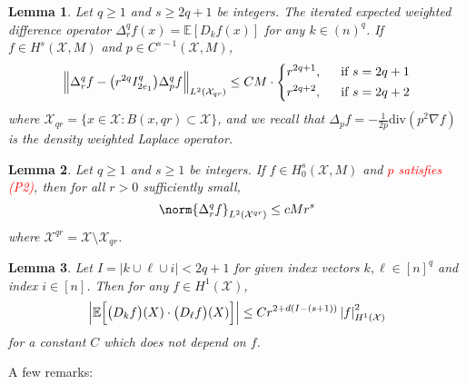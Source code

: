 \documentclass{article}
\newcommand{\abs}[1]{\left \lvert #1 \right \rvert}
\newcommand{\1}{\mathbf{1}}
\newcommand{\Xset}{\mathcal{X}}
\newcommand{\Leb}{L}
\newcommand{\Ebb}{\mathbb{E}}
\theoremstyle{alden}
\theoremstyle{aldenthm}
\newtheorem{lemma}{Lemma}
\theoremstyle{definition}
\theoremstyle{remark}
\begin{document}
\begin{lemma}
	\label{lem:expected_difference_sobolev}
	Let $q \geq 1$ and $s \geq 2q + 1$ be integers. The iterated expected weighted difference operator  $\Delta_r^qf(x) = \Ebb[D_kf(x)]$ for any $k \in (n)^q$. If $f \in H^s(\Xset,M)$ and $p \in C^{s-1}(\Xset,M)$,
	\begin{equation*}
	\Bigl\|\Delta_r^qf - \bigl(r^{2q} I_{2e_1}^{q}\bigr) \Delta_{p}^qf\Bigr\|_{\Leb^2(\Xset_{qr})} \leq CM \cdot
	\begin{dcases}
	r^{2q + 1},& ~~\textrm{if $s = 2q + 1$} \\
	r^{2q + 2},& ~~\textrm{if $s = 2q + 2$}
	\end{dcases}
	\end{equation*}
	where $\Xset_{qr} = \{x \in \Xset: B(x,qr) \subset \Xset\}$, and we recall that $\Delta_pf = -\frac{1}{2p}\mathrm{div}(p^2 \nabla f)$ is the density weighted Laplace operator.
\end{lemma}
\begin{lemma}
	\label{lem:expected_difference_boundary}
	Let $q \geq 1$ and $s \geq 1$ be integers. If $f \in H_0^s(\Xset,M)$ and \textcolor{red}{$p$ satisfies (P2)}, then for all $r > 0$ sufficiently small,
	\begin{equation*}
	\norm{\Delta_r^qf}_{\Leb^2(\Xset^{qr})} \leq cMr^s
	\end{equation*}
	where $\Xset^{qr} = \Xset \setminus \Xset_{qr}$.
\end{lemma}
\begin{lemma}
	\label{lem:expected_difference_lower_order_1}
	Let $I = \abs{k \cup \ell \cup i} < 2q + 1$ for given index vectors $k,\ell \in [n]^q$ and index $i \in [n]$. Then for any $f \in H^1(\Xset)$,
	\begin{equation*}
	\Bigl|\Ebb\Bigl[\bigl(D_kf\bigr)(X) \cdot \bigl(D_{\ell}f\bigr)(X)\Bigr]\Bigr| \leq C r^{2 + d(I - (s + 1))} \abs{f}_{H^1(\Xset)}^2
	\end{equation*}
	for a constant $C$ which does not depend on $f$.
\end{lemma}
A few remarks:
\end{document}
